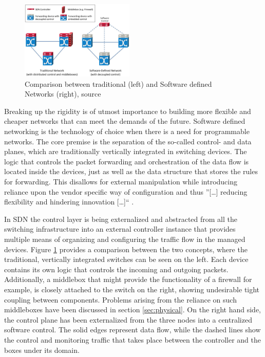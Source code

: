 \begin{figure}[h]
	\centering
	\includegraphics[width=0.48\textwidth]{images/sdn.png}
	\caption{Comparison between traditional (left) and Software defined Networks (right), source \cite{li2015software}}
	\label{img:sdn}
\end{figure}

Breaking up the rigidity is of utmost importance to building more flexible and cheaper networks that can  meet the demands of the future. Software defined networking is the technology of choice when there is a need for programmable networks. The core premise is the separation of the so-called control- and data planes, which are traditionally vertically integrated in switching devices. The logic that controls the packet forwarding and orchestration of the data flow is located inside the devices, just as well as the data structure that stores the rules for forwarding. This disallows for external manipulation while introducing  reliance upon the vendor specific way of configuration and thus ''[\dots]  reducing flexibility and hindering innovation [\dots]`` \cite{kreutz2015software}.

In SDN the control layer is being externalized and abstracted from all the switching infrastructure into an external controller instance that provides multiple means of organizing and configuring the traffic flow in the managed devices. Figure \ref{img:sdn} provides a comparison between the two concepts, where the traditional, vertically integrated switches can be seen on the left. Each device contains its own logic that controls the incoming and outgoing packets. Additionally, a middlebox that might provide the functionality of a firewall for example, is closely attached to the switch on the right, showing undesirable tight coupling between components. Problems arising from the reliance on such middleboxes have been discussed in section \ref{sec:physical}.  On the right hand side, the control plane has been externalized from the three nodes into a centralized software control. The solid edges represent data flow, while the dashed lines show the control and monitoring traffic that takes place between the controller and the boxes under its domain.

